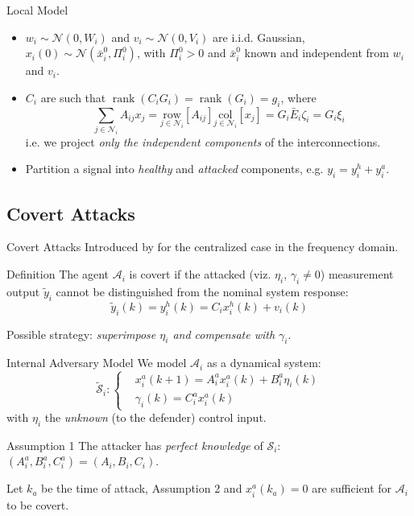 \documentclass[presentation]{beamer}
\newcommand{\NN}{{\mathcal{N}}}
\DeclareMathOperator{\rank}{\mathrm{rank}}
\newcommand{\col}[1]{\underset{{#1}}{\mathrm{col}}}
\newcommand{\row}[1]{\underset{{#1}}{\mathrm{row}}}
\begin{document}
\begin{frame}{Local Model}
\begin{itemize}
    \setlength{\itemsep}{2ex}
    \item<1-> $w_i \sim \mathcal{N}(0,W_i)$ and $v_i \sim \mathcal{N}(0,V_i)$ are i.i.d. Gaussian, $x_i(0)\sim \mathcal{N}(\bar{x}_i^0,\Pi_i^0)$, with $\Pi_i^0 > 0$ and $\bar{x}_i^0$ known and independent from $w_i$ and $v_i$.
    \item<2->$C_i$ are such that $\rank(C_iG_i) = \rank(G_i) = g_i$, where
        $$
        \sum_{j\in\mathcal{N}_i}A_{ij} x_j = \row{j\in\NN_i}\left[A_{ij}\right]\col{j\in\NN_i}\left[x_j\right] = G_i \bar{E}_i \zeta_i = G_i \xi_i
        $$
    i.e. we project \emph{only the independent components} of the interconnections.
    \item<3> Partition a signal into \emph{healthy} and \emph{attacked} components, e.g. $y_i = y_i^h + y_i^a$.
\end{itemize}

\end{frame}

\subsection{Covert Attacks}

\begin{frame}{Covert Attacks}    
Introduced by \parencite{smith2011decoupled} for the centralized case in the frequency domain.
\vfill
\begin{block}{Definition}
The agent $\mathcal A_i$ is covert if the attacked (viz. $\eta_i$, $\gamma_i \neq 0$) measurement output $\tilde y_i$ cannot be distinguished from the nominal system response:
$$  \tilde{y}_i(k) = y_i^h(k) = C_ix_i^h(k) + v_i(k) $$
\end{block}
\vspace{3ex}
Possible strategy: \emph{superimpose $\eta_i$ and compensate with $\gamma_i$}.

\end{frame}

\begin{frame}{Internal Adversary Model}
We model $\mathcal A_i$ as a dynamical system:
\begin{equation*}
    \tilde{\mathcal{S}}_i : \left\lbrace
    \begin{aligned}
    	&x^{a}_i(k+1) = A^a_i x^a_i(k) + B^a_i \eta_i(k) \\
        &\gamma_i(k) = C^a_i x^a_i(k) \,
    \end{aligned}\right. 
\end{equation*}
with $\eta_i$ the \emph{unknown} (to the defender) control input.
\bigskip
\begin{block}{Assumption 1}
The attacker has \emph{perfect knowledge} of $\mathcal S_i$: $(A^a_i, B^a_i, C^a_i) = (A_i,B_i,C_i)$.
\end{block}
\begin{block}{}
Let $k_a$ be the time of attack, Assumption 2 and $x^a_i(k_a) = 0$ are sufficient for $\mathcal A_i$ to be covert.
\end{block}
\end{frame}
\end{document}
